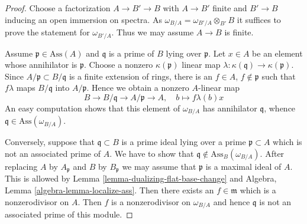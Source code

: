 \documentclass[10pt,a4paper]{amsart}
\theoremstyle{plain}
\theoremstyle{definition}
\theoremstyle{remark}
\numberwithin{equation}{subsection}
\begin{document}
\begin{proof}
Choose a factorization $A \to B' \to B$ with $A \to B'$ finite and
$B' \to B$ inducing an open immersion on spectra. As
$\omega_{B/A} = \omega_{B'/A} \otimes_{B'} B$ it suffices
to prove the statement for $\omega_{B'/A}$. Thus we may assume $A \to B$
is finite.

\medskip\noindent
Assume $\mathfrak p \in \text{Ass}(A)$ and $\mathfrak q$ is a prime
of $B$ lying over $\mathfrak p$. Let $x \in A$ be an element whose
annihilator is $\mathfrak p$. Choose a nonzero $\kappa(\mathfrak p)$
linear map $\lambda : \kappa(\mathfrak q) \to \kappa(\mathfrak p)$.
Since $A/\mathfrak p \subset B/\mathfrak q$ is a finite extension
of rings, there is an $f \in A$, $f \not \in \mathfrak p$
such that $f\lambda$ maps $B/\mathfrak q$ into $A/\mathfrak p$.
Hence we obtain a nonzero $A$-linear map
$$
B \to B/\mathfrak q \to A/\mathfrak p \to A,\quad
b \mapsto f\lambda(b)x
$$
An easy computation shows that this element of $\omega_{B/A}$
has annihilator $\mathfrak q$, whence
$\mathfrak q \in \text{Ass}(\omega_{B/A})$.

\medskip\noindent
Conversely, suppose that $\mathfrak q \subset B$ is a prime ideal
lying over a prime $\mathfrak p \subset A$ which is not an associated
prime of $A$. We have to show that
$\mathfrak q \not \in \text{Ass}_B(\omega_{B/A})$.
After replacing $A$ by $A_\mathfrak p$ and $B$ by
$B_\mathfrak p$ we may assume that $\mathfrak p$ is a maximal ideal
of $A$. This is allowed by Lemma \ref{lemma-dualizing-flat-base-change} and
Algebra, Lemma \ref{algebra-lemma-localize-ass}.
Then there exists an $f \in \mathfrak m$
which is a nonzerodivisor on $A$.
Then $f$ is a nonzerodivisor on $\omega_{B/A}$
and hence $\mathfrak q$ is not an associated prime of this module.
\end{proof}
\end{document}

